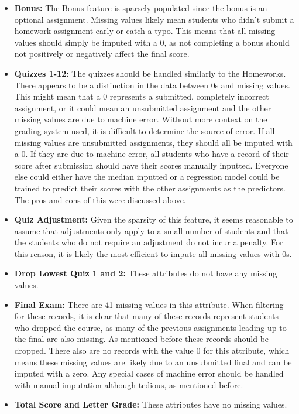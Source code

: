 \documentclass{article}
\begin{document}
\begin{itemize}
    \item \textbf{Bonus:} The Bonus feature is sparsely populated since the bonus is an optional assignment. Missing values likely mean students who didn't submit a homework assignment early or catch a typo. This means that all missing values should simply be imputed with a 0, as not completing a bonus should not positively or negatively affect the final score. 
    \item \textbf{Quizzes 1-12:} The quizzes should be handled similarly to the Homeworks. There appears to be a distinction in the data between 0s and missing values. This might mean that a 0 represents a submitted, completely incorrect assignment, or it could mean an unsubmitted assignment and the other missing values are due to machine error. Without more context on the grading system used, it is difficult to determine the source of error. If all missing values are unsubmitted assignments, they should all be imputed with a 0. If they are due to machine error, all students who have a record of their score after submission should have their scores manually inputted. Everyone else could either have the median inputted or a regression model could be trained to predict their scores with the other assignments as the predictors. The pros and cons of this were discussed above.
    \item \textbf{Quiz Adjustment:} Given the sparsity of this feature, it seems reasonable to assume that adjustments only apply to a small number of students and that the students who do not require an adjustment do not incur a penalty. For this reason, it is likely the most efficient to impute all missing values with 0s.
    \item \textbf{Drop Lowest Quiz 1 and 2:} These attributes do not have any missing values.
    \item \textbf{Final Exam:} There are 41 missing values in this attribute. When filtering for these records, it is clear that many of these records represent students who dropped the course, as many of the previous assignments leading up to the final are also missing. As mentioned before these records should be dropped. There also are no records with the value 0 for this attribute, which means these missing values are likely due to an unsubmitted final and can be imputed with a zero. Any special cases of machine error should be handled with manual imputation although tedious, as mentioned before. 
    \item \textbf{Total Score and Letter Grade:} These attributes have no missing values.
\end{itemize}
\end{document}
